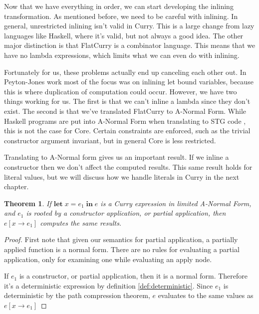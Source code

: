 \documentclass{book}
\newtheorem{theorem}{Theorem}
\theoremstyle{definition}
\newcommand{\Varid}[1]{\mathit{#1}}
\begin{document}
Now that we have everything in order, we can start developing the inlining transformation.
As mentioned before, we need to be careful with inlining.
In general, unrestricted inlining isn't valid in Curry.
This is a large change from lazy languages like Haskell, where it's valid,
but not always a good idea.
The other major distinction is that FlatCurry is a combinator language.
This means that we have no lambda expressions,
which limits what we can even do with inlining.

Fortunately for us, these problems actually end up canceling each other out.
In Peyton-Jones work \cite{haskellInliner} most of the focus was on inlining let bound variables,
because this is where duplication of computation could occur.
However, we have two things working for us.
The first is that we can't inline a lambda since they don't exist.
The second is that we've translated FlatCurry to A-Normal Form.
While Haskell programs are put into A-Normal Form when translating to STG code \cite{stg},
this is not the case for Core.
Certain constraints are enforced, such as the trivial constructor argument invariant,
but in general Core is less restricted.

Translating to A-Normal form gives us an important result.
If we inline a constructor then we don't affect the computed results.
This same result holds for literal values, but we will discuss how we handle literals
in Curry in the next chapter.

\begin{theorem}
If \ensuremath{\mathbf{let}\;\Varid{x}\mathrel{=}\Varid{e}_{\mathrm{1}}\;\mathbf{in}\;\Varid{e}} is a Curry expression in limited A-Normal Form, 
and \ensuremath{\Varid{e}_{\mathrm{1}}} is rooted by a constructor application, or partial application,
then $e[x \to e_1]$ computes the same results.
\end{theorem}

\begin{proof}
First note that given our semantics for partial application,
a partially applied function is a normal form.
There are no rules for evaluating a partial application,
only for examining one while evaluating an apply node.

If $e_1$ is a constructor, or partial application,
then it is a normal form.
Therefore it's a deterministic expression by definition \ref{def:deterministic}.
Since $e_1$ is deterministic by the path compression theorem,
$e$ evaluates to the same values as \ensuremath{\Varid{e}[\Varid{x}\to\Varid{e}_{\mathrm{1}}]}
\end{proof}
\end{document}
